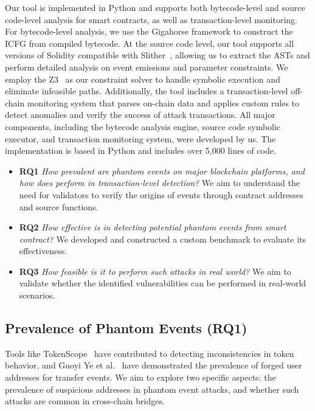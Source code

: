 \label{sec:evaluation}
Our tool is implemented in Python and supports both bytecode-level and source code-level analysis for smart contracts, as well as transaction-level monitoring. For bytecode-level analysis, we use the Gigahorse framework to construct the ICFG from compiled bytecode. At the source code level, our tool supports all versions of Solidity compatible with Slither~\cite{Slither}, allowing us to extract the ASTs and perform detailed analysis on event emissions and parameter constraints. We employ the Z3~\cite{Z3} as our constraint solver to handle symbolic execution and eliminate infeasible paths. Additionally, the tool includes a transaction-level off-chain monitoring system that parses on-chain data and applies custom rules to detect anomalies and verify the success of attack transactions. All major components, including the bytecode analysis engine, source code symbolic executor, and transaction monitoring system, were developed by us. The implementation is based in Python and includes over 5,000 lines of code.


\begin{itemize}%
  \item \textbf{RQ1} \textit{How prevalent are phantom events on major blockchain platforms, and how does \tool perform in transaction-level detection?} We aim to understand the need for validators to verify the origins of events through contract addresses and source functions.
  \item \textbf{RQ2} \textit{How effective is \tool in detecting potential phantom events from smart contract?} We developed \tool and constructed a custom benchmark to evaluate its effectiveness.
  \item \textbf{RQ3} \textit{How feasible is it to perform such attacks in real world?} We aim to validate whether the identified vulnerabilities can be performed in real-world scenarios.
\end{itemize}

\subsection{Prevalence of Phantom Events (RQ1)}

Tools like TokenScope~\cite{TokenScope} have contributed to detecting inconsistencies in token behavior, and Guoyi Ye et al.~\cite{wallet_visual} have demonstrated the prevalence of forged user addresses for transfer events. We aim to explore two specific aspects: the prevalence of suspicious addresses in phantom event attacks, and whether such attacks are common in cross-chain bridges.

